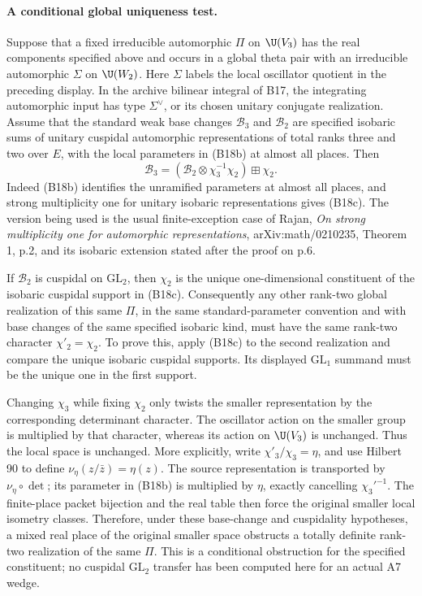 \paragraph{A conditional global uniqueness test.}
Suppose that a fixed irreducible automorphic $\Pi$ on $\U(V_3)$
has the real components specified above and occurs in a global
theta pair with an irreducible automorphic $\Sigma$ on $\U(W_2)$.
Here $\Sigma$ labels the local oscillator quotient in the
preceding display. In the archive bilinear integral of B17, the
integrating automorphic input has type $\Sigma^\vee$, or its
chosen unitary conjugate realization. Assume that the standard
weak base changes $\mathcal B_3$ and $\mathcal B_2$ are specified isobaric
sums of unitary cuspidal automorphic representations of total
ranks three and two over $E$, with the local parameters in (B18b)
at almost all places. Then
\[
 \mathcal B_3=
   (\mathcal B_2\otimes\chi_3^{-1}\chi_2)\boxplus\chi_2.
 \tag{B18c}
\]
Indeed (B18b) identifies the unramified parameters at almost all
places, and strong multiplicity one for unitary isobaric
representations gives (B18c). The version being used is the
usual finite-exception case of Rajan, \emph{On strong
multiplicity one for automorphic representations},
arXiv:math/0210235, Theorem 1, p.2, and its isobaric extension
stated after the proof on p.6.

If $\mathcal B_2$ is cuspidal on $\mathrm{GL}_2$, then
$\chi_2$ is the unique one-dimensional constituent of the
isobaric cuspidal support in (B18c). Consequently any other
rank-two global realization of this same $\Pi$, in the same
standard-parameter convention and with base changes of the
same specified isobaric kind, must have the same rank-two character
$\chi'_2=\chi_2$. To prove this, apply (B18c) to the second
realization and compare the unique isobaric cuspidal supports.
Its displayed $\mathrm{GL}_1$ summand must be the unique one
in the first support.

Changing $\chi_3$ while fixing $\chi_2$ only twists the smaller
representation by the corresponding determinant character.
The oscillator action on the smaller group is multiplied by
that character, whereas its action on $\U(V_3)$ is unchanged.
Thus the local space is unchanged. More explicitly, write
$\chi'_3/\chi_3=\eta$, and use Hilbert 90 to define
$\nu_\eta(z/\bar z)=\eta(z)$. The source representation is
transported by $\nu_\eta\circ\det$; its parameter in (B18b)
is multiplied by $\eta$, exactly cancelling $\chi_3'^{-1}$.
The finite-place packet bijection and the real table then
force the original smaller local isometry classes.
Therefore, under these base-change and cuspidality hypotheses,
a mixed real place of the original smaller space obstructs a
totally definite rank-two realization of the same $\Pi$.
This is a conditional obstruction for the specified constituent;
no cuspidal $\mathrm{GL}_2$ transfer has been computed here for
an actual A7 wedge.

